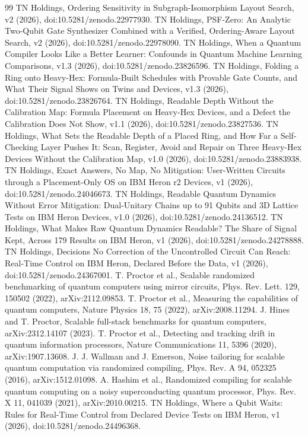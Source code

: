\documentclass[10pt,a4paper]{article}
\begin{document}
\begin{thebibliography}{99}\footnotesize
{} TN Holdings, Ordering Sensitivity in Subgraph-Isomorphism Layout Search, v2 (2026), doi:10.5281/zenodo.22977930.
 TN Holdings, PSF-Zero: An Analytic Two-Qubit Gate Synthesizer Combined with a Verified, Ordering-Aware Layout Search, v2 (2026), doi:10.5281/zenodo.22978090.
 TN Holdings, When a Quantum Compiler Looks Like a Better Learner: Confounds in Quantum Machine Learning Comparisons, v1.3 (2026), doi:10.5281/zenodo.23826596.
 TN Holdings, Folding a Ring onto Heavy-Hex: Formula-Built Schedules with Provable Gate Counts, and What Their Signal Shows on Twins and Devices, v1.3 (2026), doi:10.5281/zenodo.23826764.
 TN Holdings, Readable Depth Without the Calibration Map: Formula Placement on Heavy-Hex Devices, and a Defect the Calibration Does Not Show, v1.1 (2026), doi:10.5281/zenodo.23827536.
 TN Holdings, What Sets the Readable Depth of a Placed Ring, and How Far a Self-Checking Layer Pushes It: Scan, Register, Avoid and Repair on Three Heavy-Hex Devices Without the Calibration Map, v1.0 (2026), doi:10.5281/zenodo.23883938.
 TN Holdings, Exact Answers, No Map, No Mitigation: User-Written Circuits through a Placement-Only OS on IBM Heron r2 Devices, v1 (2026), doi:10.5281/zenodo.24046673.
 TN Holdings, Readable Quantum Dynamics Without Error Mitigation: Dual-Unitary Chains up to 91 Qubits and 3D Lattice Tests on IBM Heron Devices, v1.0 (2026), doi:10.5281/zenodo.24136512.
 TN Holdings, What Makes Raw Quantum Dynamics Readable? The Share of Signal Kept, Across 179 Results on IBM Heron, v1 (2026), doi:10.5281/zenodo.24278888.
 TN Holdings, Decisions No Correction of the Uncontrolled Circuit Can Reach: Real-Time Control on IBM Heron, Declared Before the Data, v1 (2026), doi:10.5281/zenodo.24367001.
 T. Proctor et al., Scalable randomized benchmarking of quantum computers using mirror circuits, Phys. Rev. Lett. 129, 150502 (2022), arXiv:2112.09853.
 T. Proctor et al., Measuring the capabilities of quantum computers, Nature Physics 18, 75 (2022), arXiv:2008.11294.
 J. Hines and T. Proctor, Scalable full-stack benchmarks for quantum computers, arXiv:2312.14107 (2023).
 T. Proctor et al., Detecting and tracking drift in quantum information processors, Nature Communications 11, 5396 (2020), arXiv:1907.13608.
 J. J. Wallman and J. Emerson, Noise tailoring for scalable quantum computation via randomized compiling, Phys. Rev. A 94, 052325 (2016), arXiv:1512.01098.
 A. Hashim et al., Randomized compiling for scalable quantum computing on a noisy superconducting quantum processor, Phys. Rev. X 11, 041039 (2021), arXiv:2010.00215.
 TN Holdings, Where a Qubit Waits: Rules for Real-Time Control from Declared Device Tests on IBM Heron, v1 (2026), doi:10.5281/zenodo.24496368.
\end{thebibliography}
\end{document}

